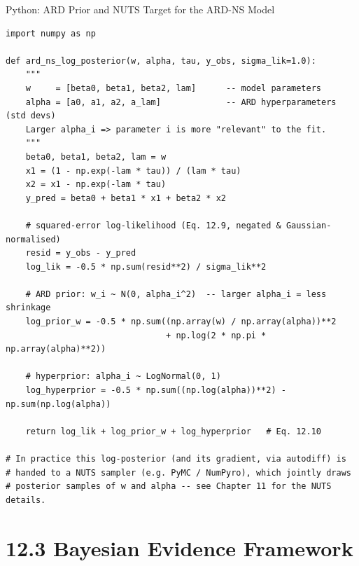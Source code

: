 \documentclass[aspectratio=169,10pt]{beamer}
\begin{document}
\begin{frame}[fragile]{Python: ARD Prior and NUTS Target for the ARD-NS Model}
\begin{lstlisting}[caption={Sketch of the ARD-NS log-posterior used with NUTS (Eqs. 12.9-12.10)}]
import numpy as np

def ard_ns_log_posterior(w, alpha, tau, y_obs, sigma_lik=1.0):
    """
    w     = [beta0, beta1, beta2, lam]      -- model parameters
    alpha = [a0, a1, a2, a_lam]             -- ARD hyperparameters (std devs)
    Larger alpha_i => parameter i is more "relevant" to the fit.
    """
    beta0, beta1, beta2, lam = w
    x1 = (1 - np.exp(-lam * tau)) / (lam * tau)
    x2 = x1 - np.exp(-lam * tau)
    y_pred = beta0 + beta1 * x1 + beta2 * x2

    # squared-error log-likelihood (Eq. 12.9, negated & Gaussian-normalised)
    resid = y_obs - y_pred
    log_lik = -0.5 * np.sum(resid**2) / sigma_lik**2

    # ARD prior: w_i ~ N(0, alpha_i^2)  -- larger alpha_i = less shrinkage
    log_prior_w = -0.5 * np.sum((np.array(w) / np.array(alpha))**2
                                + np.log(2 * np.pi * np.array(alpha)**2))

    # hyperprior: alpha_i ~ LogNormal(0, 1)
    log_hyperprior = -0.5 * np.sum((np.log(alpha))**2) - np.sum(np.log(alpha))

    return log_lik + log_prior_w + log_hyperprior   # Eq. 12.10

# In practice this log-posterior (and its gradient, via autodiff) is
# handed to a NUTS sampler (e.g. PyMC / NumPyro), which jointly draws
# posterior samples of w and alpha -- see Chapter 11 for the NUTS details.
\end{lstlisting}
\end{frame}

\section{12.3 Bayesian Evidence Framework}
\end{document}
